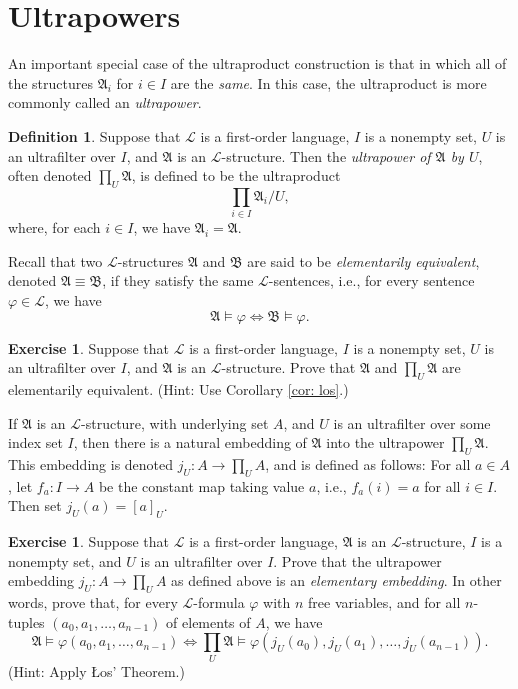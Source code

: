 \documentclass[a4paper]{memoir}
\theoremstyle{definition}
\newtheorem{definition}[theorem]{Definition}
\newtheorem{exercise}[theorem]{Exercise}
\newcommand{\mc}{\mathcal}
\newcommand{\ra}{\rightarrow}
\begin{document}
\section{Ultrapowers}

An important special case of the ultraproduct construction is that in which all of the 
structures $\mathfrak{A}_i$ for $i \in I$ are the \emph{same}. In this case, the ultraproduct 
is more commonly called an \emph{ultrapower}.

\begin{definition}
  Suppose that $\mc{L}$ is a first-order language, $I$ is a nonempty set, $U$ is an ultrafilter 
  over $I$, and $\mathfrak{A}$ is an $\mc{L}$-structure. Then the \emph{ultrapower of $\mathfrak{A}$ 
  by $U$}, often denoted $\prod_U \mathfrak{A}$, is defined to be the ultraproduct
  \[
    \prod_{i \in I} \mathfrak{A}_i / U,
  \]
  where, for each $i \in I$, we have $\mathfrak{A}_i = \mathfrak{A}$.
\end{definition}

Recall that two $\mc{L}$-structures $\mathfrak{A}$ and $\mathfrak{B}$ are said to be 
\emph{elementarily equivalent}, denoted $\mathfrak{A} \equiv \mathfrak{B}$, if they satisfy the same 
$\mc{L}$-sentences, i.e., for every sentence $\varphi \in \mc{L}$, we have
\[
  \mathfrak{A} \models \varphi \Leftrightarrow \mathfrak{B} \models \varphi.
\]

\begin{exercise} \label{exercise: el_eq}
  Suppose that $\mc{L}$ is a first-order language, $I$ is a nonempty set, $U$ is an ultrafilter 
  over $I$, and $\mathfrak{A}$ is an $\mc{L}$-structure. Prove that $\mathfrak{A}$ and  
  $\prod_U \mathfrak{A}$ are elementarily equivalent. (Hint: Use Corollary \ref{cor: los}.)
\end{exercise}

If $\mathfrak{A}$ is an $\mc{L}$-structure, with underlying set $A$, and $U$ is an ultrafilter 
over some index set $I$, 
then there is a natural embedding of $\mathfrak{A}$ into the ultrapower $\prod_U \mathfrak{A}$. 
This embedding is denoted $j_U : A \ra \prod_U A$, and is defined as follows: For all 
$a \in A$, let $f_a : I \ra A$ be the constant map taking value $a$, i.e., $f_a(i) = a$ for 
all $i \in I$. Then set $j_U(a) = [a]_U$.

\begin{exercise}
  Suppose that $\mc{L}$ is a first-order language, $\mathfrak{A}$ is an $\mc{L}$-structure, 
  $I$ is a nonempty set, and $U$ is an ultrafilter over $I$. Prove that the ultrapower embedding 
  $j_U : A \ra \prod_U A$ as defined above is an \emph{elementary embedding}. In other words, 
  prove that, for every $\mc{L}$-formula $\varphi$ with $n$ free variables, and for all 
  $n$-tuples $(a_0, a_1, \ldots, a_{n-1})$ of elements of $A$, we have 
  \[
    \mathfrak{A} \models \varphi(a_0, a_1, \ldots, a_{n-1}) \Longleftrightarrow 
    \prod_U \mathfrak{A} \models \varphi(j_U(a_0), j_U(a_1), \ldots, j_U(a_{n-1})).
  \]
  (Hint: Apply \L os' Theorem.)
\end{exercise}
\end{document}
